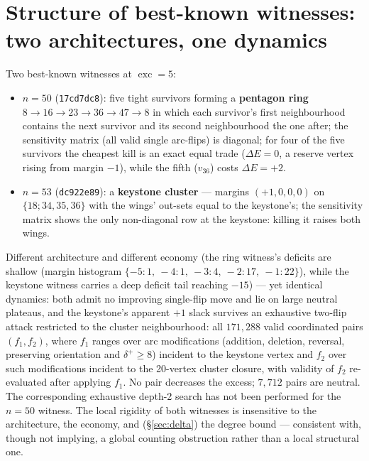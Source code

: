 \documentclass[11pt]{amsart}
\theoremstyle{remark}
\newcommand{\exc}{\operatorname{exc}}
\begin{document}
\section{Structure of best-known witnesses: two architectures, one
dynamics}\label{sec:structure}

Two best-known witnesses at $\exc = 5$:

\begin{itemize}
\item $n = 50$ (\texttt{17cd7dc8}): five tight survivors forming a
  \textbf{pentagon ring} $8 \to 16 \to 23 \to 36 \to 47 \to 8$ in which each
  survivor's first neighbourhood contains the next survivor and its second
  neighbourhood the one after; the sensitivity matrix (all valid single
  arc-flips) is diagonal; for four of the five survivors the cheapest kill
  is an exact equal trade ($\Delta E = 0$, a reserve vertex rising from
  margin $-1$), while the fifth ($v_{36}$) costs $\Delta E = +2$.
\item $n = 53$ (\texttt{dc922e89}): a \textbf{keystone cluster} --- margins
  $(+1, 0, 0, 0)$ on $\{18; 34, 35, 36\}$ with the wings' out-sets equal to
  the keystone's; the sensitivity matrix shows the only non-diagonal row at
  the keystone: killing it raises both wings.
\end{itemize}

Different architecture and different economy (the ring witness's deficits
are shallow (margin histogram $\{-5{:}1,\ -4{:}1,\ -3{:}4,\ -2{:}17,\
-1{:}22\}$), while the keystone witness carries a deep deficit tail
reaching $-15$) --- yet
identical dynamics: both admit no improving single-flip move and lie on
large neutral plateaus, and the keystone's apparent $+1$ slack survives an
exhaustive two-flip attack restricted to the cluster neighbourhood: all
$171{,}288$ valid coordinated pairs $(f_1, f_2)$, where $f_1$ ranges over
arc modifications (addition, deletion, reversal, preserving orientation and
$\delta^+ \ge 8$) incident to the keystone vertex and $f_2$ over such
modifications incident to the 20-vertex cluster closure, with validity of
$f_2$ re-evaluated after applying $f_1$. No pair decreases the excess;
$7{,}712$ pairs are neutral. The corresponding exhaustive depth-2 search
has not been performed for the $n = 50$ witness. The local rigidity of both
witnesses is insensitive to the architecture, the economy, and
(\S\ref{sec:delta}) the degree bound --- consistent with, though not
implying, a global counting obstruction rather than a local structural
one.
\end{document}
